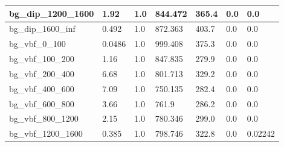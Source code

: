 \documentclass[a4paper, 10pt]{article}
\begin{document}
\begin{table}[H]
\begin{center}
\begin{tabular}{|m{23.0mm}|m{23.0mm}|m{18.0mm}|m{19.0mm}|m{19.0mm}|m{19.0mm}|m{19.0mm}|}
      \hline
      {\cellcolor{white}         bg\_dip\_1200\_1600}& {\cellcolor{white}         1.92}& {\cellcolor{white}         1.0}& {\cellcolor{white}         844.472}& {\cellcolor{white}         365.4}& {\cellcolor{green}         0.0}& {\cellcolor{green}         0.0}\\
      \hline
      {\cellcolor{white}         bg\_dip\_1600\_inf}& {\cellcolor{white}         0.492}& {\cellcolor{white}         1.0}& {\cellcolor{white}         872.363}& {\cellcolor{white}         403.7}& {\cellcolor{green}         0.0}& {\cellcolor{green}         0.0}\\
      \hline
      {\cellcolor{white}         bg\_vbf\_0\_100}& {\cellcolor{white}         0.0486}& {\cellcolor{white}         1.0}& {\cellcolor{white}         999.408}& {\cellcolor{white}         375.3}& {\cellcolor{green}         0.0}& {\cellcolor{green}         0.0}\\
      \hline
      {\cellcolor{white}         bg\_vbf\_100\_200}& {\cellcolor{white}         1.16}& {\cellcolor{white}         1.0}& {\cellcolor{white}         847.835}& {\cellcolor{white}         279.9}& {\cellcolor{green}         0.0}& {\cellcolor{green}         0.0}\\
      \hline
      {\cellcolor{white}         bg\_vbf\_200\_400}& {\cellcolor{white}         6.68}& {\cellcolor{white}         1.0}& {\cellcolor{white}         801.713}& {\cellcolor{white}         329.2}& {\cellcolor{green}         0.0}& {\cellcolor{green}         0.0}\\
      \hline
      {\cellcolor{white}         bg\_vbf\_400\_600}& {\cellcolor{white}         7.09}& {\cellcolor{white}         1.0}& {\cellcolor{white}         750.135}& {\cellcolor{white}         282.4}& {\cellcolor{green}         0.0}& {\cellcolor{green}         0.0}\\
      \hline
      {\cellcolor{white}         bg\_vbf\_600\_800}& {\cellcolor{white}         3.66}& {\cellcolor{white}         1.0}& {\cellcolor{white}         761.9}& {\cellcolor{white}         286.2}& {\cellcolor{green}         0.0}& {\cellcolor{green}         0.0}\\
      \hline
      {\cellcolor{white}         bg\_vbf\_800\_1200}& {\cellcolor{white}         2.15}& {\cellcolor{white}         1.0}& {\cellcolor{white}         780.346}& {\cellcolor{white}         299.0}& {\cellcolor{green}         0.0}& {\cellcolor{green}         0.0}\\
      \hline
      {\cellcolor{white}         bg\_vbf\_1200\_1600}& {\cellcolor{white}         0.385}& {\cellcolor{white}         1.0}& {\cellcolor{white}         798.746}& {\cellcolor{white}         322.8}& {\cellcolor{green}         0.0}& {\cellcolor{green}         0.02242}\\

\end{tabular}
\end{center}
\end{table}
\end{document}
